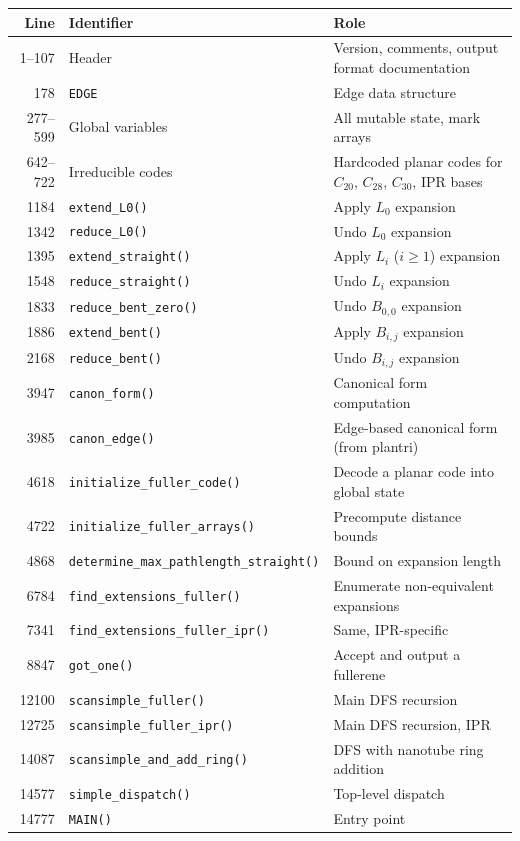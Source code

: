 \documentclass[11pt,a4paper]{article}
\theoremstyle{definition}
\begin{document}
\begin{center}
\small
\begin{tabular}{rll}
\textbf{Line} & \textbf{Identifier} & \textbf{Role} \\
\hline
1--107 & Header & Version, comments, output format documentation \\
178 & \texttt{EDGE} & Edge data structure \\
277--599 & Global variables & All mutable state, mark arrays \\
642--722 & Irreducible codes & Hardcoded planar codes for $C_{20}$, $C_{28}$, $C_{30}$, IPR bases \\
1184 & \texttt{extend\_L0()} & Apply $L_0$ expansion \\
1342 & \texttt{reduce\_L0()} & Undo $L_0$ expansion \\
1395 & \texttt{extend\_straight()} & Apply $L_i$ ($i \ge 1$) expansion \\
1548 & \texttt{reduce\_straight()} & Undo $L_i$ expansion \\
1833 & \texttt{reduce\_bent\_zero()} & Undo $B_{0,0}$ expansion \\
1886 & \texttt{extend\_bent()} & Apply $B_{i,j}$ expansion \\
2168 & \texttt{reduce\_bent()} & Undo $B_{i,j}$ expansion \\
3947 & \texttt{canon\_form()} & Canonical form computation \\
3985 & \texttt{canon\_edge()} & Edge-based canonical form (from plantri) \\
4618 & \texttt{initialize\_fuller\_code()} & Decode a planar code into global state \\
4722 & \texttt{initialize\_fuller\_arrays()} & Precompute distance bounds \\
4868 & \texttt{determine\_max\_pathlength\_straight()} & Bound on expansion length \\
6784 & \texttt{find\_extensions\_fuller()} & Enumerate non-equivalent expansions \\
7341 & \texttt{find\_extensions\_fuller\_ipr()} & Same, IPR-specific \\
8847 & \texttt{got\_one()} & Accept and output a fullerene \\
12100 & \texttt{scansimple\_fuller()} & Main DFS recursion \\
12725 & \texttt{scansimple\_fuller\_ipr()} & Main DFS recursion, IPR \\
14087 & \texttt{scansimple\_and\_add\_ring()} & DFS with nanotube ring addition \\
14577 & \texttt{simple\_dispatch()} & Top-level dispatch \\
14777 & \texttt{MAIN()} & Entry point \\
\end{tabular}
\end{center}
\end{document}
